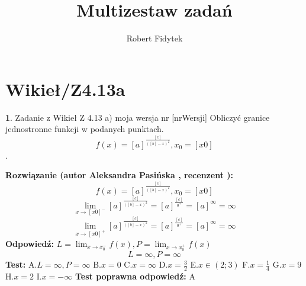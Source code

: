 \documentclass[12pt, a4paper]{article}
\title{Multizestaw zadań}
\author{Robert Fidytek}
\date{}
\theoremstyle{definition} %
\newtheorem{zad}{}
\newcommand{\kategoria}[1]{\section{#1}} %
\newcommand{\zadStart}[1]{\begin{zad}#1\newline} %
\newcommand{\zadStop}{\end{zad}}   %
\newcommand{\rozwStart}[2]{\noindent \textbf{Rozwiązanie (autor #1 , recenzent #2): }\newline} %
\newcommand{\rozwStop}{\newline}                                            %
\newcommand{\odpStart}{\noindent \textbf{Odpowiedź:}\newline}    %
\newcommand{\odpStop}{\newline}                                             %
\newcommand{\testStart}{\noindent \textbf{Test:}\newline} %
\newcommand{\testStop}{\newline} %
\newcommand{\kluczStart}{\noindent \textbf{Test poprawna odpowiedź:}\newline} %
\newcommand{\kluczStop}{\newline} %
\begin{document}
\maketitle


\kategoria{Wikieł/Z4.13a}
\zadStart{Zadanie z Wikieł Z 4.13 a) moja wersja nr [nrWersji]}
Obliczyć granice jednostronne funkcji w podanych punktach. $$f(x)=[a]^{\frac{[c]}{([b]-x)^2}},x_{0}=[x0]$$.
\zadStop
\rozwStart{Aleksandra Pasińska}{}
$$f(x)=[a]^{\frac{[c]}{([b]-x)^2}},x_{0}=[x0]$$
$$\lim_{x\rightarrow [x0]^-}[a]^{\frac{[c]}{([b]-x)^2}}=[a]^{\frac{[c]}{0^+}}=[a]^{\infty}=\infty$$ 
$$\lim_{x\rightarrow [x0]^+}[a]^{\frac{[c]}{([b]-x)^2}}=[a]^{\frac{[c]}{0^+}}=[a]^{\infty}=\infty$$ 
\rozwStop
\odpStart
$ L=\lim_{x\rightarrow x_{0}^-}f(x), P=\lim_{x\rightarrow x_{0}^+}f(x)$
$$L=\infty, P=\infty$$
\odpStop
\testStart
A.$ L=\infty, P=\infty $
B.$x=0$
C.$x=\infty$
D.$x=\frac{3}{2}$
E.$x\in (2;3)$
F.$x=\frac{1}{4}$
G.$x=9$
H.$x=2$
I.$x=-\infty$
\testStop
\kluczStart
A
\kluczStop
\end{document}
